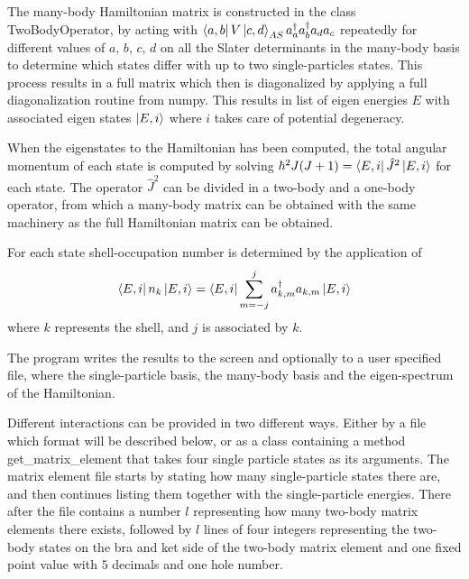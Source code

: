 The many-body Hamiltonian matrix is constructed in the class TwoBodyOperator, by acting with \(\bra{a,b}V\ket{c,d}_{AS}a^\dagger_a a^\dagger_b a_d a_c\) repeatedly for different values of \(a,\,b,\,c,\,d\) on all the Slater determinants in the many-body basis to determine which states differ with up to two single-particles states. This process results in a full matrix
which then is diagonalized by applying a full diagonalization routine from numpy. %
This results in list of eigen energies \(E\) with associated eigen states \(\ket{E,i}\) where \(i\) takes care of potential degeneracy.

When the eigenstates to the Hamiltonian has been computed, the total angular momentum of each state is computed by solving  \(\hbar^2 J(J+1) = \bra{E,i}\hat{J}^2\ket{E,i}\) for each state. The operator \(\hat{J}^2\) can be divided in a two-body and a one-body operator, from which a many-body matrix can be obtained with the same machinery as the full Hamiltonian matrix can be obtained.

For each state shell-occupation number is determined by the application of
\begin{equation}
  \bra{E,i}n_k\ket{E,i}=\bra{E,i}\sum_{m=-j}^j a^\dagger_{k,m}a_{k,m}\ket{E,i}
\end{equation}
where \(k\) represents the shell, and \(j\) is associated by \(k\).

The program writes the results to the screen and optionally to a user specified file, where the single-particle basis, the many-body basis and the eigen-spectrum of the Hamiltonian.

Different interactions can be provided in two different ways. Either by a file which format will be described below, or as a class containing a method get\_matrix\_element that takes four single particle states as its arguments.
The matrix element file starts by stating how many single-particle states there are, and then continues listing them together with the single-particle energies. There after the file contains a number \(l\) representing how many two-body matrix elements there exists, followed by \(l\) lines of four integers representing the two-body states on the bra and ket side of the two-body matrix element and one fixed point value with \(5\) decimals and one hole number.
